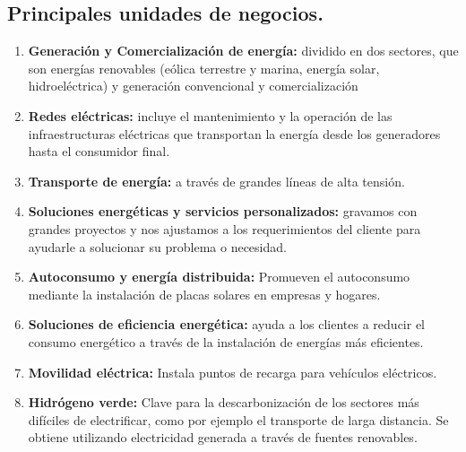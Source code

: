 \documentclass{article}
\begin{document}
\begin{figure}[h!]
\end{figure}

\subsection{Principales unidades de negocios.}
 
 \begin{enumerate}
     \item \textbf{Generación y Comercialización de energía:} dividido en dos sectores, que son energías renovables (eólica terrestre y marina, energía solar, hidroeléctrica) y generación convencional y comercialización
    \item \textbf{Redes eléctricas:} incluye el mantenimiento y la operación de las infraestructuras eléctricas que transportan la energía desde los generadores hasta el consumidor final.
    \item \textbf{Transporte de energía:} a través de grandes líneas de alta tensión.
    \item \textbf{Soluciones energéticas y servicios personalizados:} gravamos con grandes proyectos y nos ajustamos a los requerimientos del cliente para ayudarle a solucionar su problema o necesidad. 
    \item \textbf{Autoconsumo y energía distribuida:} Promueven el autoconsumo mediante la instalación de placas solares en empresas y hogares.
    \item \textbf{Soluciones de eficiencia energética:} ayuda a los clientes a reducir el consumo energético a través de la instalación de energías más eficientes.
    \item \textbf{Movilidad eléctrica:} Instala puntos de recarga para vehículos eléctricos.
    \item \textbf{Hidrógeno verde:} Clave para la descarbonización de los sectores más difíciles de electrificar, como por ejemplo el transporte de larga distancia. Se obtiene utilizando electricidad generada a través de fuentes renovables.
 
 \end{enumerate}
\end{document}

